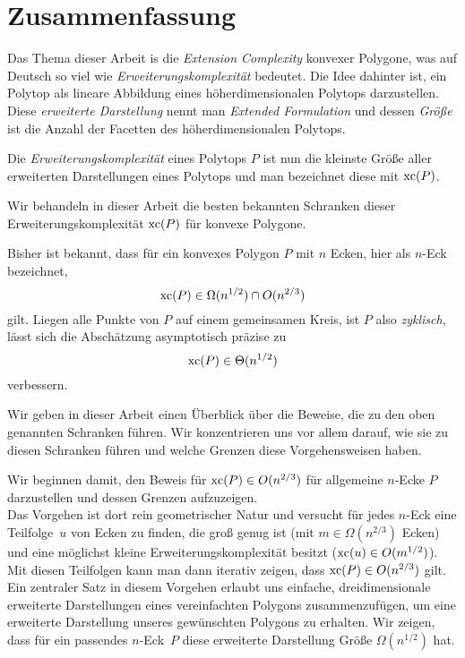 \section*{Zusammenfassung}

Das Thema dieser Arbeit is die \emph{Extension Complexity} konvexer Polygone, was auf Deutsch so viel wie \emph{Erweiterungskomplexität} bedeutet. Die Idee dahinter ist, ein Polytop als lineare Abbildung eines höherdimensionalen Polytops darzustellen. Diese \emph{erweiterte Darstellung} nennt man \emph{Extended Formulation} und dessen \emph{Größe} ist die Anzahl der Facetten des höherdimensionalen Polytops.

Die \emph{Erweiterungskomplexität} eines Polytops $P$ ist nun die kleinste Größe aller erweiterten Darstellungen eines Polytops und man bezeichnet diese mit $\operatorname{xc}(P)$.

Wir behandeln in dieser Arbeit die besten bekannten Schranken dieser Erweiterungskomplexität $\operatorname{xc}(P)$ für konvexe Polygone. 

Bisher ist bekannt, dass für ein konvexes Polygon $P$ mit $n$ Ecken, hier als $n$-Eck bezeichnet, $$\operatorname{xc}(P) \in \Omega(n^{1/2}) \cap O(n^{2/3})$$ gilt. Liegen alle Punkte von $P$ auf einem gemeinsamen Kreis, ist $P$ also \emph{zyklisch}, lässt sich die Abschätzung asymptotisch präzise zu $$\operatorname{xc}(P) \in \Theta(n^{1/2})$$ verbessern.

Wir geben in dieser Arbeit einen Überblick über die Beweise, die zu den oben genannten Schranken führen. Wir konzentrieren uns vor allem darauf, wie sie zu diesen Schranken führen und welche Grenzen diese Vorgehensweisen haben.

Wir beginnen damit, den Beweis für $\operatorname{xc}(P) \in O(n^{2/3})$ für allgemeine $n$-Ecke $P$ darzustellen und dessen Grenzen aufzuzeigen.\\
Das Vorgehen ist dort rein geometrischer Natur und versucht für jedes $n$-Eck eine Teilfolge~$u$ von Ecken zu finden, die groß genug ist (mit $m \in \Omega(n^{2/3})$ Ecken) und eine möglichst kleine Erweiterungskomplexität besitzt ($\operatorname{xc}(u) \in O(m^{1/2})$). Mit diesen Teilfolgen kann man dann iterativ zeigen, dass $\operatorname{xc}(P) \in O(n^{2/3})$ gilt.\\
Ein zentraler Satz in diesem Vorgehen erlaubt uns einfache, dreidimensionale erweiterte Darstellungen eines vereinfachten Polygons zusammenzufügen, um eine erweiterte Darstellung unseres gewünschten Polygons zu erhalten. Wir zeigen, dass für ein passendes \mbox{$n$-Eck $P$} diese erweiterte Darstellung Größe $\Omega(n^{1/2})$ hat.

